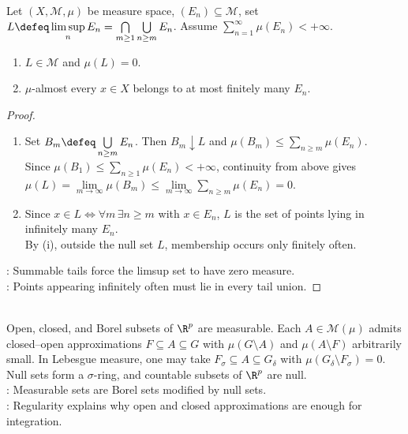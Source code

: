\begin{theorem} \label{thm:borel-cantelli-summable-events} \\
Let $(X,\mathcal{M},\mu)$ be measure space, $(E_n)\subseteq\mathcal{M}$, set $L\defeq\limsup\limits_nE_n=\bigcap\limits_{m\geq1}\bigcup\limits_{n\geq m}E_n$. Assume $\sum\limits_{n=1}^{\infty}\mu(E_n)<+\infty$.
\begin{enumerate}[label=(\roman*)]
\setlength{\itemsep}{0pt}
\item $L\in\mathcal{M}$ and $\mu(L)=0$.
\item $\mu$-almost every $x\in X$ belongs to at most finitely many $E_n$.
\end{enumerate}
\begin{proof}
\begin{enumerate}[label=(\roman*)]
\setlength{\itemsep}{0pt}
\item Set $B_m\defeq\bigcup\limits_{n\geq m}E_n$. Then $B_m\downarrow L$ and $\mu(B_m)\leq\sum\limits_{n\geq m}\mu(E_n)$.\\
Since $\mu(B_1)\leq\sum\limits_{n\geq1}\mu(E_n)<+\infty$, continuity from above gives $\mu(L)=\lim\limits_{m\to\infty}\mu(B_m)\leq\lim\limits_{m\to\infty}\sum\limits_{n\geq m}\mu(E_n)=0$.
\item Since $x\in L\iff\forall m\,\exists n\geq m$ with $x\in E_n$, $L$ is the set of points lying in infinitely many $E_n$.\\
By (i), outside the null set $L$, membership occurs only finitely often.
\end{enumerate}
: Summable tails force the limsup set to have zero measure.\\
: Points appearing infinitely often must lie in every tail union.
\end{proof}
\end{theorem}

\begin{remark} \label{rem:borel-null-regular-measurable-sets} \\
Open, closed, and Borel subsets of $\R^p$ are measurable. Each $A\in\mathcal{M}(\mu)$ admits closed--open approximations $F\subseteq A\subseteq G$ with $\mu(G\setminus A)$ and $\mu(A\setminus F)$ arbitrarily small. In Lebesgue measure, one may take $F_\sigma\subseteq A\subseteq G_\delta$ with $\mu(G_\delta\setminus F_\sigma)=0$. Null sets form a $\sigma$-ring, and countable subsets of $\R^p$ are null.\\
: Measurable sets are Borel sets modified by null sets.\\
: Regularity explains why open and closed approximations are enough for integration.
\end{remark}

